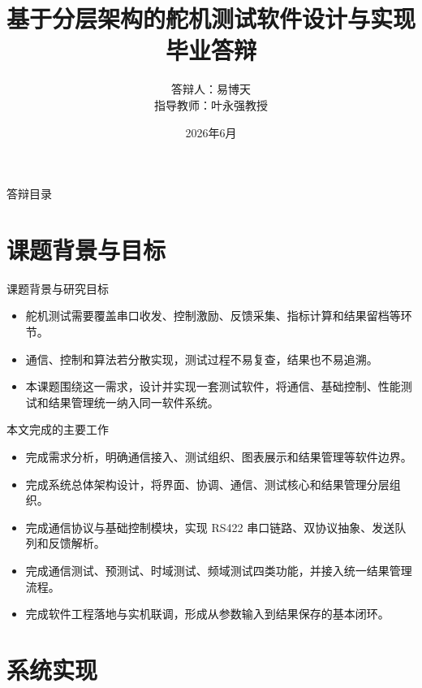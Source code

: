 \documentclass[11pt,aspectratio=169]{beamer}
\title{基于分层架构的舵机测试软件设计与实现\\毕业答辩}
\author{答辩人：易博天\\指导教师：叶永强教授}
\institute{南京航空航天大学自动化学院}
\date{2026年6月}
\begin{document}
\begin{frame}
  \titlepage
\end{frame}

\begin{frame}{答辩目录}
  \centering
  \tableofcontents[hideallsubsections]
\end{frame}

\section{课题背景与目标}

\begin{frame}{课题背景与研究目标}
  \begin{itemize}
    \item 舵机测试需要覆盖串口收发、控制激励、反馈采集、指标计算和结果留档等环节。
    \item 通信、控制和算法若分散实现，测试过程不易复查，结果也不易追溯。
    \item 本课题围绕这一需求，设计并实现一套测试软件，将通信、基础控制、性能测试和结果管理统一纳入同一软件系统。
  \end{itemize}
\end{frame}

\begin{frame}{本文完成的主要工作}
  \begin{itemize}
    \item 完成需求分析，明确通信接入、测试组织、图表展示和结果管理等软件边界。
    \item 完成系统总体架构设计，将界面、协调、通信、测试核心和结果管理分层组织。
    \item 完成通信协议与基础控制模块，实现 RS422 串口链路、双协议抽象、发送队列和反馈解析。
    \item 完成通信测试、预测试、时域测试、频域测试四类功能，并接入统一结果管理流程。
    \item 完成软件工程落地与实机联调，形成从参数输入到结果保存的基本闭环。
  \end{itemize}
\end{frame}

\section{系统实现}
\end{document}
